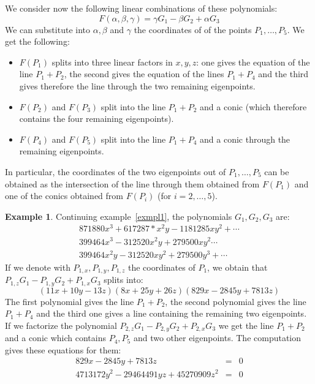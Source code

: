 \documentclass{amsart}
\theoremstyle{plain}
\theoremstyle{definition}
\newtheorem{example}[theorem]{Example}
\begin{document}
We consider now the following linear combinations of these polynomials:
\begin{equation}
F(\alpha, \beta, \gamma) = \gamma G_1 - \beta G_2 +\alpha G_3
\end{equation}
We can substitute into $\alpha, \beta$ and $\gamma$ the coordinates of
of the points $P_1, \dots, P_5$.
We get the following:
\begin{itemize}
\item $F(P_1)$ splits into three linear factors in $x, y, z$: one gives
  the equation of
  the line $P_1+P_2$, the second gives the equation of the lines $P_1+P_4$
  and the third gives therefore the line through the two remaining eigenpoints.
\item $F(P_2)$ and $F(P_3)$ split into the line $P_1+P_2$ and a conic
  (which therefore contains the four remaining eigenpoints).
\item $F(P_4)$ and $F(P_5)$ split into the line $P_1+P_4$ and a conic
  through the remaining eigenpoints.
\end{itemize}
In particular, the coordinates of the two eigenpoints out of
$P_1, \dots, P_5$ can be obtained as the intersection of the line through them
obtained from $F(P_1)$ and one of the conics obtained from $F(P_i)$ (for
$i= 2, \dots, 5$).  

\begin{example}
  Continuing example~\ref{exmpl1}, the polynomials $G_1, G_2, G_3$ are:
\[
  \begin{array}{l}
    871880x^3 + 617287*x^2y - 1181285xy^2 + \cdots\\
    399464x^3 - 312520x^2y + 279500xy^2 \cdots\\
    399464x^2y - 312520xy^2 + 279500y^3 +\cdots
  \end{array}
  \]
  If we denote with $P_{1,x}, P_{1,y}, P_{1,z}$ the coordinates of $P_1$, we
  obtain that $P_{1,z}G_1-P_{1,y}G_2+P_{1, x}G_3$ splits into:
  \[
    (11x + 10y - 13z) (8x + 25y + 26z) (829x - 2845y + 7813z) 
  \]
  The first polynomial gives the line $P_1+P_2$,
  the second polynomial gives the line $P_1+P_4$ and the third one gives a line
  containing the remaining two eigenpoints.
  If we factorize the polynomial $P_{2,z}G_1-P_{2,y}G_2+P_{2,x}G_3$ we get
  the line $P_1+P_2$ and a conic which contains $P_4, P_5$ and two other
  eigenpoints. The computation gives these equations for them:
  \begin{eqnarray*}
    829x - 2845y + 7813z & = & 0 \\
    4713172y^2 - 29464491yz + 45270909z^2 & = & 0
  \end{eqnarray*}
\end{example}
\end{document}
